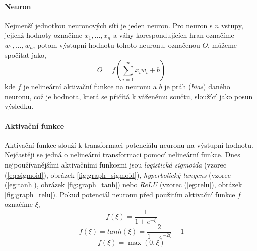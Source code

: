 \paragraph{Neuron}
Nejmenší jednotkou neuronových sítí je jeden neuron. Pro neuron s $n$ vstupy,
jejichž hodnoty označíme $x_1,...,x_n$ a váhy korespondujících hran označíme\\
$w_1,...,w_n$, potom výstupní hodnotu tohoto neuronu, označenou $O$,
můžeme spočítat jako,
\begin{equation}
    O = f(\sum_{i=1}^{n} x_iw_i + b)
\end{equation}
kde $f$ je nelineární aktivační funkce na neuronu a $b$ je práh (\emph{bias})
daného neuronu, což je hodnota, která se přičítá k váženému součtu, sloužící
jako posun výsledku.

\paragraph{Aktivační funkce}
Aktivační funkce slouží k transformaci potenciálu neuronu na výstupní hodnotu.
Nejčastěji se jedná o nelineární transformaci pomocí nelineární funkce. Dnes
nejpoužívanějšími aktivačními funkcemi jsou \emph{logistická sigmoida} (vzorec
(\ref{eq:sigmoid}), obrázek \ref{fig:graph_sigmoid}), \emph{hyperbolický tangens}
(vzorec (\ref{eg:tanh}), obrázek \ref{fig:graph_tanh}) nebo \emph{ReLU} (vzorec
(\ref{eg:relu}), obrázek \ref{fig:graph_relu}). Pokud potenciál neuronu před
použitím aktivační funkce $f$ označíme $\xi$,
\begin{equation} \label{eq:sigmoid}
    f(\xi) = \frac{1}{1+e^{-\xi}}
\end{equation}
\begin{equation} \label{eg:tanh}
    f(\xi) = tanh(\xi) = \frac{2}{1+e^{-2\xi}} - 1
\end{equation}
\begin{equation} \label{eg:relu}
    f(\xi) = \max(0, \xi)
\end{equation}
